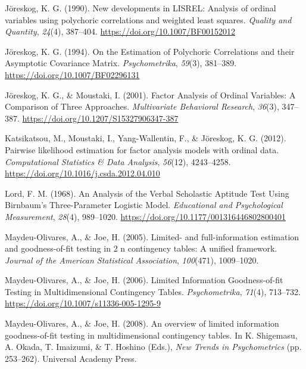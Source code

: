 \documentclass[
  letterpaper,
  DIV=11,
  numbers=noendperiod]{scrartcl}
\newlength{\cslhangindent}
\newenvironment{CSLReferences}[2] %
 {\begin{list}{}{%
  \setlength{\itemindent}{0pt}
  \setlength{\leftmargin}{0pt}
  \setlength{\parsep}{0pt}
  \ifodd #1
   \setlength{\leftmargin}{\cslhangindent}
   \setlength{\itemindent}{-1\cslhangindent}
  \fi
  \setlength{\itemsep}{#2\baselineskip}}}
 {\end{list}}
\begin{document}
\begin{CSLReferences}{1}{0}
Jöreskog, K. G. (1990). New developments in {LISREL}: Analysis of
ordinal variables using polychoric correlations and weighted least
squares. \emph{Quality and Quantity}, \emph{24}(4), 387--404.
\url{https://doi.org/10.1007/BF00152012}

Jöreskog, K. G. (1994). On the {Estimation} of {Polychoric Correlations}
and their {Asymptotic Covariance Matrix}. \emph{Psychometrika},
\emph{59}(3), 381--389. \url{https://doi.org/10.1007/BF02296131}

Jöreskog, K. G., \& Moustaki, I. (2001). Factor {Analysis} of {Ordinal
Variables}: {A Comparison} of {Three Approaches}. \emph{Multivariate
Behavioral Research}, \emph{36}(3), 347--387.
\url{https://doi.org/10.1207/S15327906347-387}

Katsikatsou, M., Moustaki, I., Yang-Wallentin, F., \& Jöreskog, K. G.
(2012). Pairwise likelihood estimation for factor analysis models with
ordinal data. \emph{Computational Statistics \& Data Analysis},
\emph{56}(12), 4243--4258.
\url{https://doi.org/10.1016/j.csda.2012.04.010}

Lord, F. M. (1968). An {Analysis} of the {Verbal Scholastic Aptitude
Test Using Birnbaum}'s {Three-Parameter Logistic Model}.
\emph{Educational and Psychological Measurement}, \emph{28}(4),
989--1020. \url{https://doi.org/10.1177/001316446802800401}

Maydeu-Olivares, A., \& Joe, H. (2005). Limited- and full-information
estimation and goodness-of-fit testing in 2 n contingency tables: {A}
unified framework. \emph{Journal of the American Statistical
Association}, \emph{100}(471), 1009--1020.

Maydeu-Olivares, A., \& Joe, H. (2006). Limited {Information
Goodness-of-fit Testing} in {Multidimensional Contingency Tables}.
\emph{Psychometrika}, \emph{71}(4), 713--732.
\url{https://doi.org/10.1007/s11336-005-1295-9}

Maydeu-Olivares, A., \& Joe, H. (2008). An overview of limited
information goodness-of-fit testing in multidimensional contingency
tables. In K. Shigemasu, A. Okada, T. Imaizumi, \& T. Hoshino (Eds.),
\emph{New {Trends} in {Psychometrics}} (pp. 253--262). Universal Academy
Press.


\end{CSLReferences}
\end{document}
